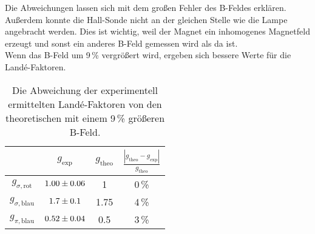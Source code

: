 Die Abweichungen lassen sich mit dem großen Fehler des B-Feldes erklären. Außerdem konnte die Hall-Sonde nicht an der gleichen Stelle wie die Lampe angebracht werden. Dies ist wichtig, weil der Magnet ein inhomogenes Magnetfeld erzeugt und sonst ein anderes B-Feld gemessen wird als da ist. \\
Wenn das B-Feld um 9\,\% vergrößert wird, ergeben sich bessere Werte für die Landé-Faktoren.

\begin{table}[H]
   \centering
   \caption{Die Abweichung der experimentell ermittelten Landé-Faktoren von den theoretischen mit einem 9\,\% größeren B-Feld.}
   \label{tab:}
   \begin{tabular}{c|c|c|c}
     & $g_\text{exp}$ & $g_\text{theo}$ & $\frac{|g_\text{theo} - g_\text{exp}|}{g_\text{theo}}$ \\
     \hline
     $g_{\sigma,\text{rot}}$  & $\num{1.00 +- 0.06}$ & 1 & 0\,\% \\
     $g_{\sigma,\text{blau}}$ & $\num{1.7 +- 0.1}$   & 1.75 & 4\,\% \\
     $g_{\pi,\text{blau}}$    & $\num{0.52 +- 0.04}$ & 0.5 & 3\,\% \\
   \end{tabular}
\end{table}

